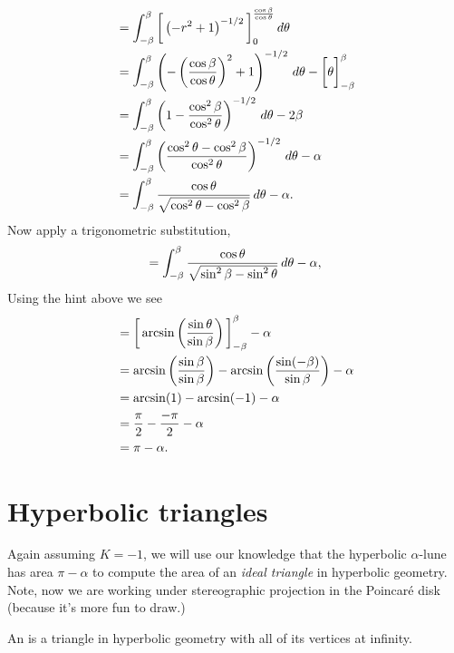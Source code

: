 \documentclass[newpage,hints,handout]{ximera}
\begin{document}
\begin{problem}
\begin{freeResponse}
\begin{align*}
      &= \int_{-\beta}^\beta \bigg[ \left(-r^2+1\right)^{-1/2} \bigg]_0^{\frac{\cos \beta}{\cos\theta}}\,d \theta\\
      &= \int_{-\beta}^\beta \left(-\left(\frac{\cos \beta}{\cos\theta}\right)^2+1\right)^{-1/2}\,d\theta - \bigg[ \theta \bigg]_{-\beta}^\beta\\
      &= \int_{-\beta}^\beta \left(1-\frac{\cos^2 \beta}{\cos^2\theta}\right)^{-1/2}\,d \theta -2\beta\\
      &= \int_{-\beta}^\beta \left(\frac{\cos^2\theta - \cos^2 \beta}{\cos^2\theta}\right)^{-1/2} \,d \theta-\alpha\\
      &= \int_{-\beta}^\beta \frac{\cos\theta}{\sqrt{\cos^2\theta - \cos^2 \beta}}\,d \theta - \alpha.
    \end{align*}
    Now apply a trigonometric substitution,
    \[
    = \int_{-\beta}^\beta \frac{\cos\theta}{\sqrt{\sin^2\beta - \sin^2 \theta}}\,d \theta- \alpha,
    \]
    Using the hint above we see
    \begin{align*}
      &= \bigg[ \arcsin\left(\frac{\sin\theta}{\sin\beta}\right) \bigg]_{-\beta}^\beta - \alpha\\
      &= \arcsin\left(\frac{\sin\beta}{\sin\beta}\right)- \arcsin\left(\frac{\sin(-\beta)}{\sin\beta}\right)- \alpha\\
      &= \arcsin(1)-\arcsin(-1)-\alpha\\
      &= \frac{\pi}{2}-\frac{-\pi}{2}-\alpha\\
      &= \pi-\alpha.
    \end{align*}
  \end{freeResponse}
\end{problem}


\section{Hyperbolic triangles}

Again assuming $K=-1$, we will use our knowledge that the hyperbolic
$\alpha$-lune has area $\pi-\alpha$ to compute the area of an
\textit{ideal triangle} in hyperbolic geometry. Note, now we are working under
stereographic projection in the Poincar\'e disk (because it's more fun to draw.)

\begin{definition}
  An  is a triangle in hyperbolic geometry with all of
  its vertices at infinity.
\end{definition}
\end{document}
